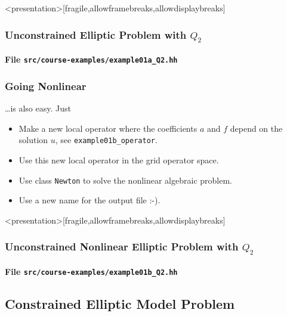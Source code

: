 \begin{frame}<presentation>[fragile,allowframebreaks,allowdisplaybreaks]
\frametitle<presentation>{Unconstrained Elliptic Problem with $Q_2$}
\framesubtitle<presentation>{File \texttt{src/course-examples/example01a\_Q2.hh}}

\end{frame}


\begin{frame}
\frametitle{Going Nonlinear}
\ldots is also easy. Just 
\begin{itemize}
\item Make a new local operator where the coefficients $a$ and $f$ depend on the solution $u$,
see \lstinline{example01b_operator}.
\item Use this new local operator in the grid operator space.
\item Use class \lstinline{Newton} to solve the nonlinear algebraic problem.
\item Use a new name for the output file :-).
\end{itemize}
\end{frame}

\begin{frame}<presentation>[fragile,allowframebreaks,allowdisplaybreaks]
\frametitle<presentation>{Unconstrained Nonlinear Elliptic Problem with $Q_2$}
\framesubtitle<presentation>{File \texttt{src/course-examples/example01b\_Q2.hh}}

\end{frame}


\subsection{Constrained Elliptic Model Problem}

